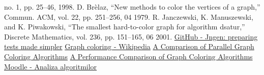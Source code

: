 \documentclass[runningheads]{paper}
\begin{document}
\begin{thebibliography}{8}
    no. 1, pp. 25–46, 1998.
    D. Br\`{e}laz, “New methods to color the vertices of a graph,”  Commun.
    ACM, vol. 22, pp. 251–256, 04 1979.
    R. Janczewski, K. Manuszewski, and K. Piwakowski, “The smallest
    hard-to-color graph for algorithm dsatur,” Discrete Mathematics, vol.
    236, pp. 151–165, 06 2001.
    \href{https://github.com/ifsmirnov/jngen}{GitHub - Jngen: preparing tests made simpler}
    \bibitem{}
    \href{https://en.wikipedia.org/wiki/Graph_coloring}{Graph coloring - Wikipedia}
    \bibitem{}
    \href{https://citeseerx.ist.psu.edu/document?repid=rep1&type=pdf&doi=203a7b17267a28a06808bfb3b0b9571e32d15503}{A Comparison of Parallel Graph Coloring Algorithms}
    \bibitem{}
    \href{https://dergipark.org.tr/en/download/article-file/254140}{A Performance Comparison of Graph Coloring Algorithms}
    \bibitem{}
    \href{https://curs.upb.ro/2022/mod/folder/view.php?id=77105}{Moodle - Analiza algoritmilor}
    \end{thebibliography}
\end{document}
